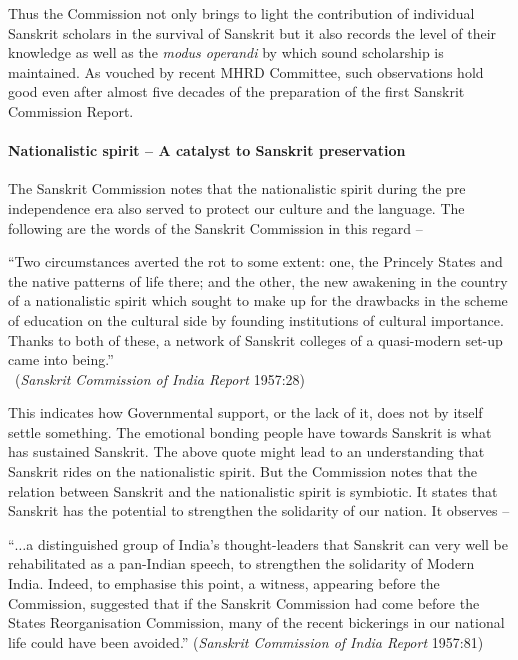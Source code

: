 Thus the Commission not only brings to light the contribution of individual Sanskrit scholars in the survival of Sanskrit but it also records the level of their knowledge as well as the {\sl modus operandi} by which sound scholarship is maintained. As vouched by recent MHRD Committee, such observations hold good even after almost five decades of the preparation of the first Sanskrit Commission Report.  

\paragraph{Nationalistic spirit – A catalyst to Sanskrit preservation}

The Sanskrit Commission notes that the nationalistic spirit during the pre independence era also served to protect our culture and the language. The following are the words of the Sanskrit Commission in this regard  – 
\begin{myquote}
\eleven
“Two circumstances averted the rot to some extent: one, the Princely States and the native patterns of life there; and the other, the new awakening in the country of a nationalistic spirit which sought to make up for the drawbacks in the scheme of education on the cultural side by founding institutions of cultural importance. Thanks to both of these, a network of Sanskrit colleges of a quasi-modern set-up came into being.”\\[-15pt] 

~\hfill({\sl Sanskrit Commission of India Report} 1957:28)
\end{myquote}

This indicates how Governmental support, or the lack of it, does not by itself settle something. The emotional bonding people have towards Sanskrit is what has sustained Sanskrit. The above quote might lead to an understanding that Sanskrit rides on the nationalistic spirit. But the Commission notes that the relation between Sanskrit and the nationalistic spirit is symbiotic. It states that Sanskrit has the potential to strengthen the solidarity of our nation. It observes – 

\begin{myquote}
\eleven
“$\ldots$a distinguished group of India's thought-leaders that Sanskrit can very well be rehabilitated as a pan-Indian speech, to strengthen the solidarity of Modern India. Indeed, to emphasise this point, a witness, appearing before the Commission, suggested that if the Sanskrit Commission had come before the States Reorganisation Commission, many of the recent bickerings in our national life could have been avoided.”  \hfill({\sl Sanskrit Commission of India Report} 1957:81)
\end{myquote}


